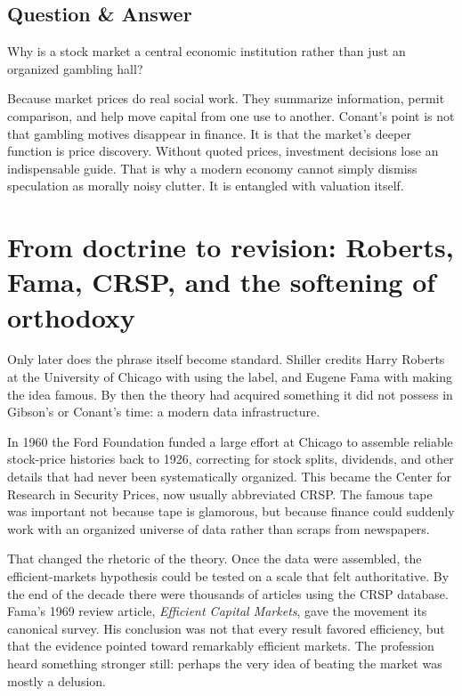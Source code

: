 \subsection{Question \& Answer}

Why is a stock market a central economic institution rather than just an organized gambling hall?

Because market prices do real social work. They summarize information, permit comparison, and help move capital from one use to another. Conant's point is not that gambling motives disappear in finance. It is that the market's deeper function is price discovery. Without quoted prices, investment decisions lose an indispensable guide. That is why a modern economy cannot simply dismiss speculation as morally noisy clutter. It is entangled with valuation itself.

\section{From doctrine to revision: Roberts, Fama, CRSP, and the softening of orthodoxy}

Only later does the phrase itself become standard. Shiller credits Harry Roberts at the University of Chicago with using the label, and Eugene Fama with making the idea famous. By then the theory had acquired something it did not possess in Gibson's or Conant's time: a modern data infrastructure.

In 1960 the Ford Foundation funded a large effort at Chicago to assemble reliable stock-price histories back to 1926, correcting for stock splits, dividends, and other details that had never been systematically organized. This became the Center for Research in Security Prices, now usually abbreviated CRSP. The famous tape was important not because tape is glamorous, but because finance could suddenly work with an organized universe of data rather than scraps from newspapers.

That changed the rhetoric of the theory. Once the data were assembled, the efficient-markets hypothesis could be tested on a scale that felt authoritative. By the end of the decade there were thousands of articles using the CRSP database. Fama's 1969 review article, \emph{Efficient Capital Markets}, gave the movement its canonical survey. His conclusion was not that every result favored efficiency, but that the evidence pointed toward remarkably efficient markets. The profession heard something stronger still: perhaps the very idea of beating the market was mostly a delusion.

